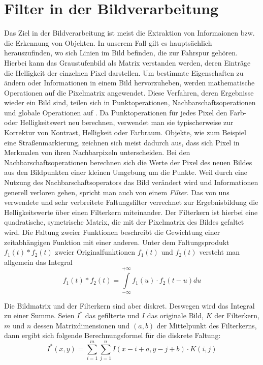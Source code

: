 \section{Filter in der Bildverarbeitung}

Das Ziel in der Bildverarbeitung ist meist die Extraktion von Informaionen bzw. die Erkennung von Objekten. In unserem Fall gilt es hauptsächlich herauszufinden, wo sich Linien im Bild befinden, die zur Fahrspur gehören. Hierbei kann das Graustufenbild als Matrix verstanden werden, deren Einträge die Helligkeit der einzelnen Pixel darstellen. Um bestimmte Eigenschaften zu ändern oder Informationen in einem Bild hervorzuheben, werden mathematische Operationen auf die Pixelmatrix angewendet. Diese Verfahren, deren Ergebnisse wieder ein Bild sind, teilen sich in Punktoperationen, Nachbarschaftsoperationen und globale Operationen auf \autocite{jaehneDigitaleBildverarbeitungMit2005}. Da Punktoperationen für jedes Pixel den Farb- oder Helligkeitswert neu berechnen, verwendet man sie typischerweise zur Korrektur von Kontrast, Helligkeit oder Farbraum. Objekte, wie zum Beispiel eine Straßenmarkierung, zeichnen sich meist dadurch aus, dass sich Pixel in Merkmalen von ihren Nachbarpixeln unterscheiden. Bei den Nachbarschaftsoperationen berechnen sich die Werte der Pixel des neuen Bildes aus den Bildpunkten einer kleinen Umgebung um die Punkte. Weil durch eine Nutzung des Nachbarschaftsoperators das Bild verändert wird und Informationen generell verloren gehen, spricht man auch von einem \textit{Filter}. Das von uns verwendete und sehr verbreitete Faltungsfilter verrechnet zur Ergebnisbildung die Helligkeitswerte über einen Filterkern miteinander. Der Filterkern ist hierbei eine quadratische, symetrische Matrix, die mit der Pixelmatrix des Bildes gefaltet wird. Die Faltung zweier Funktionen beschreibt die Gewichtung einer zeitabhängigen Funktion mit einer anderen. Unter dem Faltungsprodukt \( f_1(t) \ast f_2(t) \) zweier Originalfunktionen \(f_1(t) \) und \(f_2(t) \) versteht man allgemein das Integral \autocite{papulaMathematikFuerIngenieure}
\begin{equation}
f_1(t) \ast f_2(t) = \int \limits_{-\infty}^{+\infty} f_1(u) \cdot f_2(t-u)du
\end{equation}

 Die Bildmatrix und der Filterkern sind aber diskret. Deswegen wird das Integral zu einer Summe. Seien \( I^{\ast} \) das gefilterte und \( I \) das originale Bild, \(K\) der Filterkern, \(m\) und \(n\) dessen Matrixdimensionen und \( (a,b) \) der Mittelpunkt des Filterkerns, dann ergibt sich folgende Berechnungsformel für die diskrete Faltung:
\begin{equation}
I^{\ast}(x,y) = \sum_{i=1}^{m} \sum_{j=1}^{n} I(x-i+a, y-j+b) \cdot K(i,j)
\end{equation}

